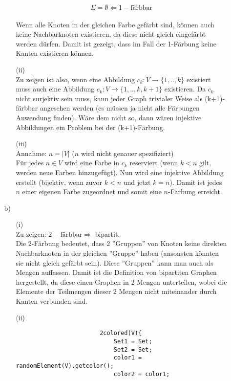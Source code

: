 \documentclass[a4paper,11pt,ngerman]{scrartcl}
\begin{document}
\begin{enumerate}
\begin{enumerate}
\begin{enumerate}
\begin{multicols}{2}
						\[E = \emptyset \Leftarrow 1-\text{färbbar}\] \\
						Wenn alle Knoten in der gleichen Farbe gefärbt sind, können auch keine Nachbarknoten
						existieren, da diese nicht gleich eingefärbt werden dürfen. Damit ist gezeigt, dass
						im Fall der 1-Färbung keine Kanten existieren können.
					\end{multicols}
				\item[(ii)]\quad \\
					Zu zeigen ist also, wenn eine Abbildung $c_k:V\rightarrow\{1,..,k\}$ existiert muss
					auch eine Abbildung $c_k:V\rightarrow\{1,..,k,k+1\}$ existieren.
					Da $c_k$ nicht surjektiv sein muss, kann jeder Graph trivialer Weise als (k+1)-färbbar 
					angesehen werden (es müssen ja nicht alle Färbungen Anwendung finden).
					Wäre dem nicht so, dann wären injektive Abbildungen ein Problem bei der (k+1)-Färbung.
				\item[(iii)]\quad \\
					Annahme: \(n = |V|\) ($n$ wird nicht genauer spezifiziert) \\
					Für jedes \(n \in V\) wird eine Farbe in \(c_k\) reserviert (wenn $k < n$ gilt, werden neue 
					Farben hinzugefügt). Nun wird eine injektive Abbildung erstellt (bijektiv, wenn zuvor $k < n$ 
					und jetzt $k = n$). Damit ist jedes $n$ einer eigenen Farbe zugeordnet und somit eine 
					$n$-Färbung erreicht.
			\end{enumerate}
			\item[b)]
			\begin{enumerate}
				\item[(i)]\quad \\
					Zu zeigen: \(2-\text{färbbar} \Rightarrow\) bipartit. \\
					Die 2-Färbung bedeutet, dass 2 ''Gruppen'' von Knoten keine direkten Nachbarknoten in der 
					gleichen ''Gruppe'' haben (ansonsten könnten sie nicht gleich gefärbt sein).
					Diese ''Gruppen'' kann man auch als Mengen auffassen. Damit ist die Definition von bipartiten 
					Graphen hergestellt, da diese einen Graphen in 2 Mengen unterteilen, wobei die Elemente der 
					Teilmengen dieser 2 Mengen nicht miteinander durch Kanten verbunden sind.
				\newpage
				\item[(ii)]\quad \\
					\begin{verbatim}
						2colored(V){
						    Set1 = Set;
						    Set2 = Set;
						    color1 = randomElement(V).getcolor();
						    color2 = color1;

\end{verbatim}
\end{enumerate}
\end{enumerate}
\end{enumerate}
\end{document}
